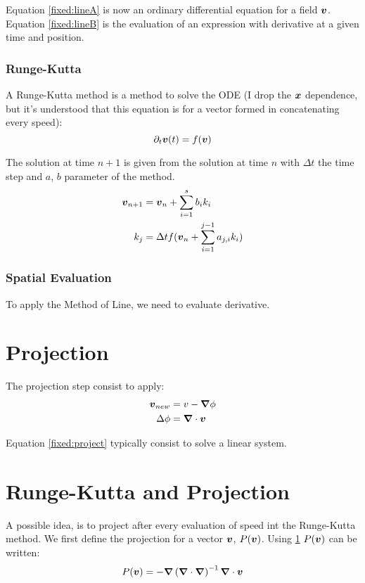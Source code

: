Equation \ref{fixed:lineA} is now an ordinary differential equation for a field ${\boldsymbol {v}}$.
Equation \ref{fixed:lineB} is the evaluation of an expression with derivative at a given time and position.

\subsubsection{Runge-Kutta}

A Runge-Kutta method is a method to solve the ODE (I drop the ${\boldsymbol {x}}$ dependence, but it's understood that this equation is for a vector formed in concatenating every speed):
\begin{equation}
 \partial_t {\boldsymbol {v}}(t)=f({\boldsymbol {v}})
\end{equation}

The solution at time $n+1$ is given from the solution at time $n$ with $\Delta t$ the time step and $a$, $b$ parameter of the method.
\begin{align*}
	{\boldsymbol {v}}_{n+1}&={\boldsymbol {v}}_{n}+\sum_{i=1}^{s}b_{i}k_{i}\\
	k_{j}&=\Delta t f({\boldsymbol {v}}_{n}+\sum_{i=1}^{j-1}a_{j,i}k_{i})
\end{align*}

\subsubsection{Spatial Evaluation}
To apply the Method of Line, we need to evaluate derivative.

\section{Projection}
\label{fixed:projection}
The projection step consist to apply:
 \begin{align}
  {\boldsymbol {v}}_{new}&=v-{\boldsymbol {\nabla}}\phi\\
  \Delta \phi&={\boldsymbol {\nabla}} \cdot {\boldsymbol {v}}\label{fixed:project}
 \end{align}

 Equation \ref{fixed:project} typically consist to solve a linear system.
 
 \section{Runge-Kutta and Projection}
 
 A possible idea, is to project after every evaluation of speed int the Runge-Kutta method.
 We first define the projection for a vector ${\boldsymbol {v}}$, $P({\boldsymbol {v}})$.
 Using \ref{fixed:projection} $P({\boldsymbol {v}})$ can be written:
 \begin{equation}
  P({\boldsymbol {v}})=-{\boldsymbol {\nabla}}\left({\boldsymbol {\nabla}}\cdot {\boldsymbol {\nabla}}\right)^{-1}{\boldsymbol {\nabla}}\cdot{\boldsymbol {v}}
 \end{equation}

